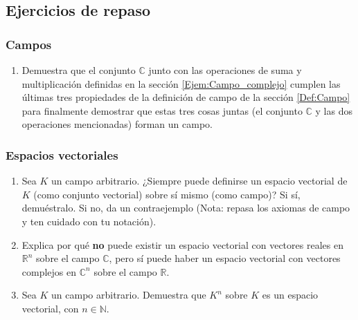 \documentclass[apuntes]{subfiles}
\begin{document}
\subsection{Ejercicios de repaso}

\subsubsection{Campos}

\begin{enumerate}
    \item Demuestra que el conjunto $\mathbb{C}$ junto con las operaciones de suma y multiplicación definidas en la sección \ref{Ejem:Campo_complejo} cumplen las últimas tres propiedades de la definición de campo de la sección \ref{Def:Campo} para finalmente demostrar que estas tres cosas juntas (el conjunto $\mathbb{C}$ y las dos operaciones mencionadas) forman un campo. 
\end{enumerate}

\subsubsection{Espacios vectoriales} \label{Ejer:Espacios_vectoriales}

\begin{enumerate}
    \item Sea $K$ un campo arbitrario. ¿Siempre puede definirse un espacio vectorial de $K$ (como conjunto vectorial) sobre sí mismo (como campo)? Si sí, demuéstralo. Si no, da un contraejemplo (Nota: repasa los axiomas de campo y ten cuidado con tu notación). 
    \item Explica por qué \textbf{no} puede existir un espacio vectorial con vectores reales en $\mathbb{R}^n$ sobre el campo $\mathbb{C}$, pero sí puede haber un espacio vectorial con vectores complejos en $\mathbb{C}^n$ sobre el campo $\mathbb{R}$. 
    \item Sea $K$ un campo arbitrario. Demuestra que $K^n$ sobre $K$ es un espacio vectorial, con $n\in\mathbb{N}$. 
\end{enumerate}
\end{document}

